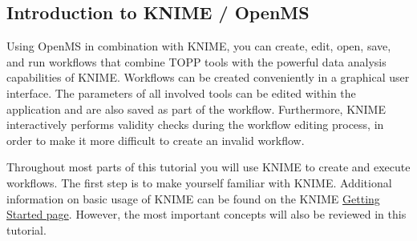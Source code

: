 
\subsection{Introduction to KNIME / OpenMS}
\label{KNIME_Intro}

Using OpenMS in combination with KNIME, you can create, edit, open, save, and run workflows
that combine TOPP tools with the powerful data analysis capabilities of KNIME. Workflows can
be created conveniently in a graphical user interface. The parameters of all involved
tools can be edited within the application and are also saved as part of the workflow.
Furthermore, KNIME interactively performs validity checks during the workflow editing
process, in order to make it more difficult to create an invalid workflow.

Throughout most parts of this tutorial you will use KNIME to create and
execute workflows. The first step is to make yourself familiar with KNIME. Additional
information on basic usage of KNIME can be found on the KNIME
\href{https://tech.knime.org/knime}{Getting Started page}. However,
the most important concepts will also be reviewed in this tutorial.

